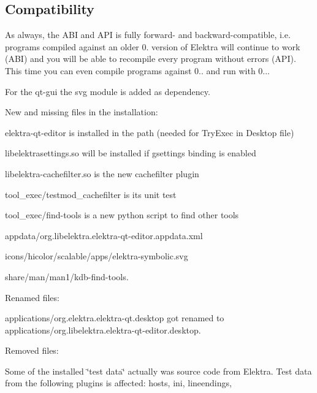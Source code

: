 \subsection*{Compatibility}

As always, the A\+BI and A\+PI is fully forward-\/ and backward-\/compatible, i.\+e. programs compiled against an older 0. version of Elektra will continue to work (A\+BI) and you will be able to recompile every program without errors (A\+PI). This time you can even compile programs against 0.. and run with 0...

For the qt-\/gui the svg module is added as dependency.

New and missing files in the installation\+:


\begin{DoxyItemize}
\item {\ttfamily elektra-\/qt-\/editor} is installed in the path (needed for Try\+Exec in Desktop file)
\item {\ttfamily libelektrasettings.\+so} will be installed if {\ttfamily gsettings} binding is enabled
\item {\ttfamily libelektra-\/cachefilter.\+so} is the new cachefilter plugin
\item {\ttfamily tool\+\_\+exec/testmod\+\_\+cachefilter} is its unit test
\item {\ttfamily tool\+\_\+exec/find-\/tools} is a new python script to find other tools
\item {\ttfamily appdata/org.\+libelektra.\+elektra-\/qt-\/editor.\+appdata.\+xml}
\item {\ttfamily icons/hicolor/scalable/apps/elektra-\/symbolic.\+svg}
\item {\ttfamily share/man/man1/kdb-\/find-\/tools.}
\end{DoxyItemize}

Renamed files\+:


\begin{DoxyItemize}
\item {\ttfamily applications/org.\+elektra.\+elektra-\/qt.\+desktop} got renamed to {\ttfamily applications/org.\+libelektra.\+elektra-\/qt-\/editor.\+desktop}.
\end{DoxyItemize}

Removed files\+:


\begin{DoxyItemize}
\item Some of the installed \char`\"{}test data\char`\"{} actually was source code from Elektra. Test data from the following plugins is affected\+: {\ttfamily hosts}, {\ttfamily ini}, {\ttfamily lineendings},
\end{DoxyItemize}

